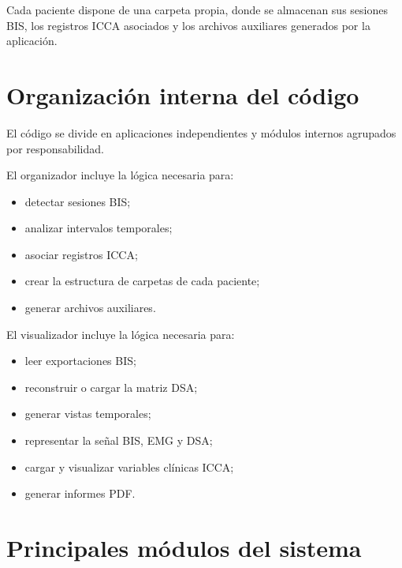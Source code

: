 \documentclass[
  spanish,
  a4paper,
  12pt,
  twoside]{memoir}
\providecommand{\tightlist}{%
  \setlength{\itemsep}{0pt}\setlength{\parskip}{0pt}}
\begin{document}
Cada paciente dispone de una carpeta propia, donde se almacenan sus
sesiones BIS, los registros ICCA asociados y los archivos auxiliares
generados por la aplicación.

\section{Organización interna del
código}\label{organizaciuxf3n-interna-del-cuxf3digo}

El código se divide en aplicaciones independientes y módulos internos
agrupados por responsabilidad.

El organizador incluye la lógica necesaria para:

\begin{itemize}
\tightlist
\item
  detectar sesiones BIS;
\item
  analizar intervalos temporales;
\item
  asociar registros ICCA;
\item
  crear la estructura de carpetas de cada paciente;
\item
  generar archivos auxiliares.
\end{itemize}

El visualizador incluye la lógica necesaria para:

\begin{itemize}
\tightlist
\item
  leer exportaciones BIS;
\item
  reconstruir o cargar la matriz DSA;
\item
  generar vistas temporales;
\item
  representar la señal BIS, EMG y DSA;
\item
  cargar y visualizar variables clínicas ICCA;
\item
  generar informes PDF.
\end{itemize}

\section{Principales módulos del
sistema}\label{principales-muxf3dulos-del-sistema}
\end{document}
